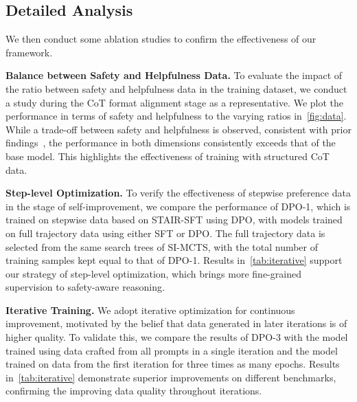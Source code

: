 \subsection{Detailed Analysis}

We then conduct some ablation studies to confirm the effectiveness of our framework.

\textbf{Balance between Safety and Helpfulness Data.} To evaluate the impact of the ratio between safety and helpfulness data in the training dataset, we conduct a study during the CoT format alignment stage as a representative. We plot the performance in terms of safety and helpfulness to the varying ratios in~\cref{fig:data}. While a trade-off between safety and helpfulness is observed, consistent with prior findings~\cite{bai2022training}, the performance in both dimensions consistently exceeds that of the base model. This highlights the effectiveness of training with structured CoT data.

\textbf{Step-level Optimization.} To verify the effectiveness of stepwise preference data in the stage of self-improvement, we compare the performance of DPO-1, which is trained on stepwise data based on STAIR-SFT using DPO, with models trained on full trajectory data using either SFT or DPO. The full trajectory data is selected from the same search trees of SI-MCTS, with the total number of training samples kept equal to that of DPO-1. Results in~\cref{tab:iterative} support our strategy of step-level optimization, which brings more fine-grained supervision to safety-aware reasoning.

\textbf{Iterative Training.} We adopt iterative optimization for continuous improvement, motivated by the belief that data generated in later iterations is of higher quality. To validate this, we compare the results of DPO-3 with the model trained using data crafted from all prompts in a single iteration and the model trained on data from the first iteration for three times as many epochs. Results in~\cref{tab:iterative} demonstrate superior improvements on different benchmarks, confirming the improving data quality throughout iterations.





